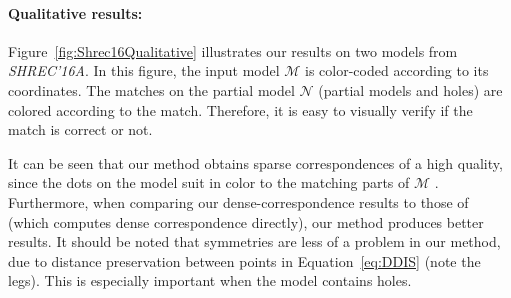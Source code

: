 \documentclass[10pt,twocolumn,letterpaper]{article}
\begin{document}
\paragraph{Qualitative results:} 
Figure~\ref{fig:Shrec16Qualitative} illustrates our results on two models from {\em SHREC'16A}.
In this figure, the input model $\mathcal{M}$ is color-coded according to its coordinates.
The matches on the partial model $\mathcal{N}$ (partial models and holes) are colored according to the match.
Therefore, it is easy to visually verify if the match is correct or not.

It can be seen that our method obtains sparse correspondences of a high quality, since the dots on the model suit in color to the matching parts of $\mathcal{M}$ .
Furthermore, when comparing our dense-correspondence results to those of~\cite{rodola2017partial} (which computes dense correspondence directly), our method produces better results.
It should be noted that symmetries are less of a problem in our method, due to distance preservation between points in Equation~\eqref{eq:DDIS} (note the legs).
This is especially important when the model contains holes.
\end{document}
